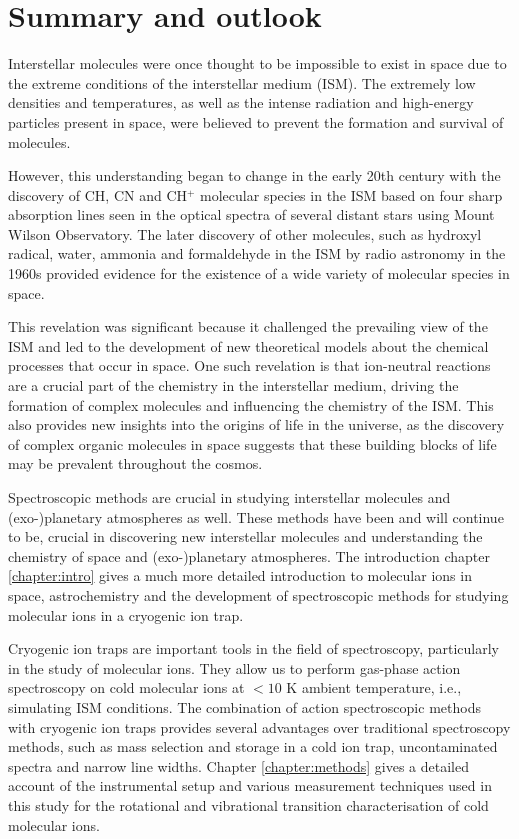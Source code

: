 \chapter{Summary and outlook}

Interstellar molecules were once thought to be impossible to exist in space due to the extreme conditions of the interstellar medium (ISM). The extremely low densities and temperatures, as well as the intense radiation and high-energy particles present in space, were believed to prevent the formation and survival of molecules.

However, this understanding began to change in the early 20th century with the discovery of CH, CN and CH$^+$ molecular species in the ISM based on four sharp absorption lines seen in the optical spectra of several distant stars using Mount Wilson Observatory. The later discovery of other molecules, such as hydroxyl radical, water, ammonia and formaldehyde in the ISM by radio astronomy in the 1960s provided evidence for the existence of a wide variety of molecular species in space.

This revelation was significant because it challenged the prevailing view of the ISM and led to the development of new theoretical models about the chemical processes that occur in space. One such revelation is that ion-neutral reactions are a crucial part of the chemistry in the interstellar medium, driving the formation of complex molecules and influencing the chemistry of the ISM. This also provides new insights into the origins of life in the universe, as the discovery of complex organic molecules in space suggests that these building blocks of life may be prevalent throughout the cosmos.

Spectroscopic methods are crucial in studying interstellar molecules and (exo-)planetary atmospheres as well. These methods have been and will continue to be, crucial in discovering new interstellar molecules and understanding the chemistry of space and (exo-)planetary atmospheres. The introduction chapter \ref{chapter:intro} gives a much more detailed introduction to molecular ions in space, astrochemistry and the development of spectroscopic methods for studying molecular ions in a cryogenic ion trap.

Cryogenic ion traps are important tools in the field of spectroscopy, particularly in the study of molecular ions. They allow us to perform gas-phase action spectroscopy on cold molecular ions at $< 10$ K ambient temperature, i.e., simulating ISM conditions. The combination of action spectroscopic methods with cryogenic ion traps provides several advantages over traditional spectroscopy methods, such as mass selection and storage in a cold ion trap, uncontaminated spectra and narrow line widths. Chapter \ref{chapter:methods} gives a detailed account of the instrumental setup and various measurement techniques used in this study for the rotational and vibrational transition characterisation of cold molecular ions.

